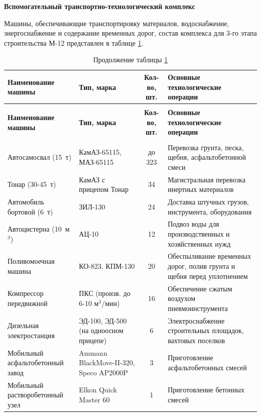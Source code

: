 \textbf{Вспомогательный транспортно-технологический комплекс}

Машины, обеспечивающие транспортировку материалов, водоснабжение, энергоснабжение и содержание временных дорог, состав комплекса для 3-го этапа строительства М-12 представлен в таблице \ref{tab:aux_complex_qty}.

\begin{longtable}{|>{\raggedright\arraybackslash}p{3.8cm}|>{\raggedright\arraybackslash}p{3.2cm}|c|>{\raggedright\arraybackslash}p{5.0cm}|}
	\caption{Состав вспомогательного транспортно-технологического комплекса} \label{tab:aux_complex_qty} \\
	\hline
	\textbf{Наименование машины} & \textbf{Тип, марка} & \textbf{Кол-во, шт.} & \textbf{Основные технологические операции} \\
	\hline
	\endfirsthead
	\caption*{Продолжение таблицы \ref{tab:aux_complex_qty}} \\
	\hline
	\textbf{Наименование машины} & \textbf{Тип, марка} & \textbf{Кол-во, шт.} & \textbf{Основные технологические операции} \\
	\hline
	\endhead
	\hline
	\multicolumn{4}{r}{\small Продолжение на следующей странице} \\
	\endfoot
	\hline
	\endlastfoot
	Автосамосвал (15~т) & КамАЗ-65115, МАЗ-65115 & до 323 & Перевозка грунта, песка, щебня, асфальтобетонной смеси \\
	Тонар (30-45~т) & КамАЗ с прицепом Тонар & 34 & Магистральная перевозка инертных материалов \\
	Автомобиль бортовой (6~т) & ЗИЛ-130 & 24 & Доставка штучных грузов, инструмента, оборудования \\
	Автоцистерна (10~м\(^3\)) & АЦ-10 & 12 & Подвоз воды для производственных и хозяйственных нужд \\
	Поливомоечная машина & КО-823, КПМ-130 & 20 & Обеспыливание временных дорог, полив грунта и щебня перед уплотнением \\
	Компрессор передвижной & ПКС (произв. до 6-10 м\(^3\)/мин) & 16 & Обеспечение сжатым воздухом пневмоинструмента \\
	Дизельная электростанция & ЭД-100, ЭД-500 (на одноосном прицепе) & 6 & Электроснабжение строительных площадок, вахтовых поселков \\
	Мобильный асфальтобетонный завод & Ammann BlackMove-II-320, Speco AP2000P & 3 & Приготовление асфальтобетонных смесей \\
	Мобильный растворобетонный узел & Elkon Quick Master 60 & 1 & Приготовление бетонных смесей \\
\end{longtable}

